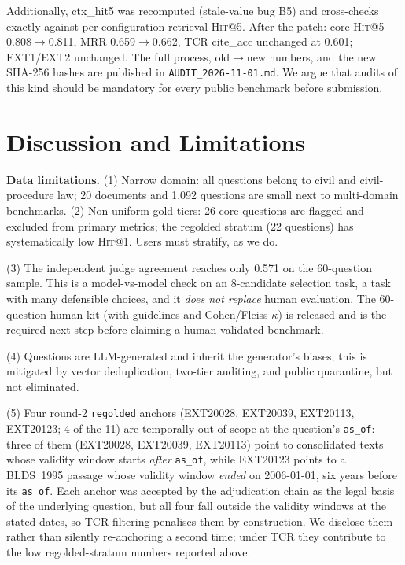 \documentclass[10pt,a4paper,twocolumn]{article}
\newcommand{\hit}{\textsc{Hit}}
\newcommand{\code}[1]{\texttt{#1}}
\begin{document}
Additionally, ctx\_hit5 was recomputed (stale-value bug B5) and cross-checks exactly against per-configuration retrieval \hit{}@5. After the patch: core \hit{}@5 0.808$\rightarrow$0.811, MRR 0.659$\rightarrow$0.662, TCR cite\_acc unchanged at 0.601; EXT1/EXT2 unchanged. The full process, old$\rightarrow$new numbers, and the new SHA-256 hashes are published in \code{AUDIT\_2026-11-01.md}. We argue that audits of this kind should be mandatory for every public benchmark before submission.

\section{Discussion and Limitations}
\label{sec:limits}

\textbf{Data limitations.} (1) Narrow domain: all questions belong to civil and civil-procedure law; 20 documents and 1,092 questions are small next to multi-domain benchmarks. (2) Non-uniform gold tiers: 26 core questions are flagged and excluded from primary metrics; the regolded stratum (22 questions) has systematically low \hit{}@1. Users must stratify, as we do.

(3) The independent judge agreement reaches only 0.571 on the 60-question sample. This is a model-vs-model check on an 8-candidate selection task, a task with many defensible choices, and it \emph{does not replace} human evaluation. The 60-question human kit (with guidelines and Cohen/Fleiss $\kappa$) is released and is the required next step before claiming a human-validated benchmark.

(4) Questions are LLM-generated and inherit the generator's biases; this is mitigated by vector deduplication, two-tier auditing, and public quarantine, but not eliminated.

(5) Four round-2 \code{regolded} anchors (EXT20028, EXT20039, EXT20113, EXT20123; 4 of the 11) are temporally out of scope at the question's \code{as\_of}: three of them (EXT20028, EXT20039, EXT20113) point to consolidated texts whose validity window starts \emph{after} \code{as\_of}, while EXT20123 points to a BLDS~1995 passage whose validity window \emph{ended} on 2006-01-01, six years before its \code{as\_of}. Each anchor was accepted by the adjudication chain as the legal basis of the underlying question, but all four fall outside the validity windows at the stated dates, so TCR filtering penalises them by construction. We disclose them rather than silently re-anchoring a second time; under TCR they contribute to the low regolded-stratum numbers reported above.
\end{document}
